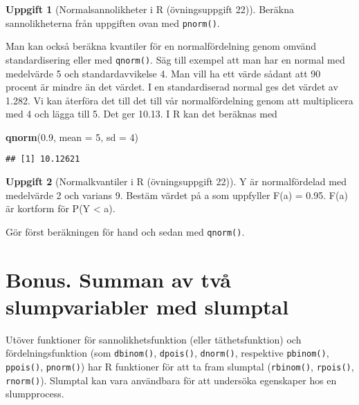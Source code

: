 \documentclass[
]{book}
\newenvironment{Shaded}{\begin{snugshade}}{\end{snugshade}}
\newcommand{\AttributeTok}[1]{\textcolor[rgb]{0.13,0.29,0.53}{#1}}
\newcommand{\DecValTok}[1]{\textcolor[rgb]{0.00,0.00,0.81}{#1}}
\newcommand{\FloatTok}[1]{\textcolor[rgb]{0.00,0.00,0.81}{#1}}
\newcommand{\FunctionTok}[1]{\textcolor[rgb]{0.13,0.29,0.53}{\textbf{#1}}}
\newcommand{\NormalTok}[1]{#1}
\theoremstyle{definition}
\theoremstyle{definition}
\theoremstyle{definition}
\newtheorem{exercise}{Uppgift}[chapter]
\theoremstyle{definition}
\theoremstyle{remark}
\begin{document}
\begin{exercise}[Normalsannolikheter i R (övningsuppgift 22)]
Beräkna sannolikheterna från uppgiften ovan med \texttt{pnorm()}.
\end{exercise}

Man kan också beräkna kvantiler för en normalfördelning genom omvänd standardisering eller med \texttt{qnorm()}.
Säg till exempel att man har en normal med medelvärde 5 och standardavvikelse 4. Man vill ha ett värde sådant att 90 procent är mindre än det värdet.
I en standardiserad normal ges det värdet av 1.282. Vi kan återföra det till det till vår normalfördelning genom att multiplicera med 4 och lägga till 5.
Det ger 10.13. I R kan det beräknas med

\begin{Shaded}
\begin{Highlighting}[]
\FunctionTok{qnorm}\NormalTok{(}\FloatTok{0.9}\NormalTok{, }\AttributeTok{mean =} \DecValTok{5}\NormalTok{, }\AttributeTok{sd =} \DecValTok{4}\NormalTok{)}
\end{Highlighting}
\end{Shaded}

\begin{verbatim}
## [1] 10.12621
\end{verbatim}

\begin{exercise}[Normalkvantiler i R (övningsuppgift 22)]
Y är normalfördelad med medelvärde 2 och varians 9. Bestäm värdet på a som uppfyller F(a) = 0.95. F(a) är kortform för P(Y \textless{} a).

Gör först beräkningen för hand och sedan med \texttt{qnorm()}.
\end{exercise}

\hypertarget{bonus.-summan-av-tvuxe5-slumpvariabler-med-slumptal}{%
\section{Bonus. Summan av två slumpvariabler med slumptal}\label{bonus.-summan-av-tvuxe5-slumpvariabler-med-slumptal}}

Utöver funktioner för sannolikhetsfunktion (eller täthetsfunktion) och fördelningsfunktion (som \texttt{dbinom()}, \texttt{dpois()}, \texttt{dnorm()}, respektive \texttt{pbinom()}, \texttt{ppois()}, \texttt{pnorm()}) har R funktioner för att ta fram slumptal (\texttt{rbinom()}, \texttt{rpois()}, \texttt{rnorm()}). Slumptal kan vara användbara för att undersöka egenskaper hos en slumpprocess.
\end{document}
